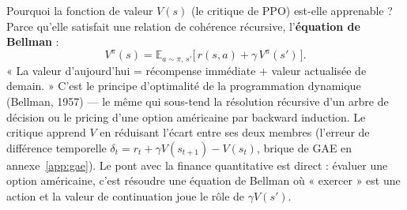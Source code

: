 \documentclass[11pt,a4paper]{article}
\begin{document}
Pourquoi la fonction de valeur $V(s)$ (le critique de PPO) est-elle apprenable ? Parce
qu'elle satisfait une relation de cohérence récursive, l'\textbf{équation de Bellman} :
\[
V^\pi(s) = \mathbb{E}_{a \sim \pi,\, s'}\big[\, r(s, a) + \gamma\, V^\pi(s')\,\big] .
\]
« La valeur d'aujourd'hui = récompense immédiate + valeur actualisée de demain. » C'est
le principe d'optimalité de la programmation dynamique (Bellman, 1957) --- le même qui
sous-tend la résolution récursive d'un arbre de décision ou le pricing d'une option
américaine par backward induction. Le critique apprend $V$ en réduisant l'écart entre
ses deux membres (l'erreur de différence temporelle
$\delta_t = r_t + \gamma V(s_{t+1}) - V(s_t)$, brique de GAE en annexe~\ref{app:gae}).
Le pont avec la finance quantitative est direct : évaluer une option américaine, c'est
résoudre une équation de Bellman où « exercer » est une action et la valeur de
continuation joue le rôle de $\gamma V(s')$.
\end{document}
